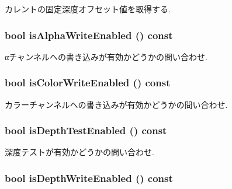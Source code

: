 カレントの固定深度オフセット値を取得する. \hypertarget{classm3g_1_1CompositingMode_bfcec134f769763d492011fc8ccadcce}{
\subsubsection[{isAlphaWriteEnabled}]{\setlength{\rightskip}{0pt plus 5cm}bool isAlphaWriteEnabled () const}}
\label{classm3g_1_1CompositingMode_bfcec134f769763d492011fc8ccadcce}


αチャンネルへの書き込みが有効かどうかの問い合わせ. \hypertarget{classm3g_1_1CompositingMode_35ffa21944393c774552003dd2cb03ea}{
\subsubsection[{isColorWriteEnabled}]{\setlength{\rightskip}{0pt plus 5cm}bool isColorWriteEnabled () const}}
\label{classm3g_1_1CompositingMode_35ffa21944393c774552003dd2cb03ea}


カラーチャンネルへの書き込みが有効かどうかの問い合わせ. \hypertarget{classm3g_1_1CompositingMode_4dd97b29a6e12c5e64477ab1546f93f1}{
\subsubsection[{isDepthTestEnabled}]{\setlength{\rightskip}{0pt plus 5cm}bool isDepthTestEnabled () const}}
\label{classm3g_1_1CompositingMode_4dd97b29a6e12c5e64477ab1546f93f1}


深度テストが有効かどうかの問い合わせ. \hypertarget{classm3g_1_1CompositingMode_0ee4c812abd4a99e0373158d36dc45d9}{
\subsubsection[{isDepthWriteEnabled}]{\setlength{\rightskip}{0pt plus 5cm}bool isDepthWriteEnabled () const}}
\label{classm3g_1_1CompositingMode_0ee4c812abd4a99e0373158d36dc45d9}


